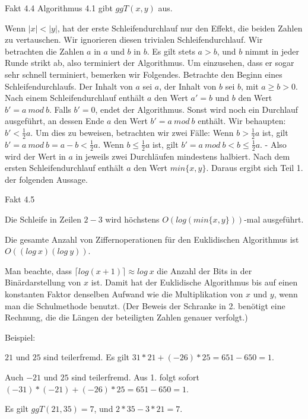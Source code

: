 \documentclass[a4paper]{article}
\begin{document}
\begin{multicols}{3}
    Fakt 4.4 Algorithmus 4.1 gibt $ggT(x,y)$ aus.

    Wenn $|x|<|y|$, hat der erste Schleifendurchlauf nur den Effekt, die beiden Zahlen zu vertauschen. Wir ignorieren diesen trivialen Schleifendurchlauf. Wir betrachten die Zahlen $a$ in $a$ und $b$ in $b$. Es gilt stets $a>b$, und $b$ nimmt in jeder Runde strikt ab, also terminiert der Algorithmus. Um einzusehen, dass er sogar sehr schnell terminiert, bemerken wir Folgendes. Betrachte den Beginn eines Schleifendurchlaufs. Der Inhalt von $a$ sei $a$, der Inhalt von $b$ sei $b$, mit $a\geq b >0$. Nach einem Schleifendurchlauf enthält $a$ den Wert $a'=b$ und $b$ den Wert $b'=a\ mod\ b$. Falls $b'=0$, endet der Algorithmus. Sonst wird noch ein Durchlauf ausgeführt, an dessen Ende $a$ den Wert $b'=a\ mod\ b$ enthält. Wir behaupten: $b'<\frac{1}{2} a$. Um dies zu beweisen, betrachten wir zwei Fälle: Wenn $b>\frac{1}{2} a$ ist, gilt $b'=a\ mod\ b=a-b<\frac{1}{2} a$. Wenn $b\leq\frac{1}{2} a$ ist, gilt $b'=a\ mod\ b < b\leq\frac{1}{2} a$. - Also wird der Wert in $a$ in jeweils zwei Durchläufen mindestens halbiert. Nach dem ersten Schleifendurchlauf enthält $a$ den Wert $min\{x,y\}$. Daraus ergibt sich Teil 1. der folgenden Aussage.

    Fakt 4.5
    \begin{enumerate*}
        \item Die Schleife in Zeilen $2-3$ wird höchstens $O(log(min\{x,y\}))$-mal ausgeführt.
        \item  Die gesamte Anzahl von Ziffernoperationen für den Euklidischen Algorithmus ist $O((log\ x)(log\ y))$.
    \end{enumerate*}

    Man beachte, dass $\lceil log(x+1)\rceil\approx log\ x$ die Anzahl der Bits in der Binärdarstellung von $x$ ist. Damit hat der Euklidische Algorithmus bis auf einen konstanten Faktor denselben Aufwand wie die Multiplikation von $x$ und $y$, wenn man die Schulmethode benutzt. (Der Beweis der Schranke in 2. benötigt eine Rechnung, die die Längen der beteiligten Zahlen genauer verfolgt.)

    Beispiel:
    \begin{enumerate*}
        \item $21$ und $25$ sind teilerfremd. Es gilt $31*21 + (-26)*25 = 651-650 = 1$.
        \item  Auch $-21$ und $25$ sind teilerfremd. Aus 1. folgt sofort $(-31)*(-21) + (-26)*25 =651 -650 = 1$.
        \item  Es gilt $ggT(21,35) = 7$, und $2* 35 - 3 *21 = 7$.
    \end{enumerate*}


\end{multicols}
\end{document}
